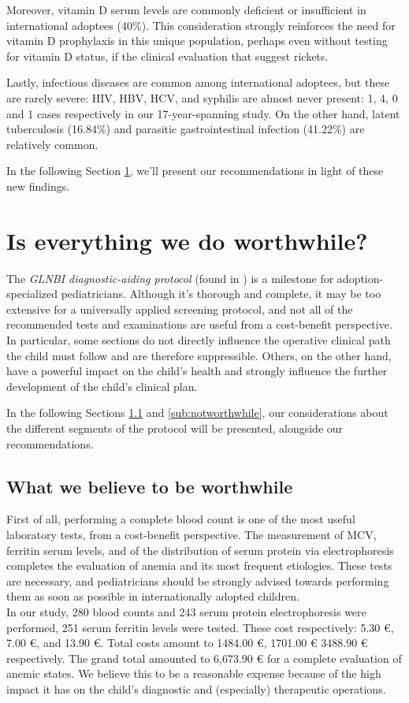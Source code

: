 Moreover, vitamin D serum levels are commonly deficient or insufficient in international adoptees (40\%). This consideration strongly reinforces the need for vitamin D prophylaxis  in this unique population, perhaps even without testing for vitamin D status, if the clinical evaluation that suggest rickets.

Lastly, infectious diseases are common among international adoptees, but these are rarely severe: HIV, HBV, HCV, and syphilis are almost never present: 1, 4, 0 and 1 cases respectively in our 17-year-spanning study. On the other hand, latent tuberculosis (16.84\%) and parasitic gastrointestinal infection (41.22\%) are relatively common.

In the following Section \ref{sec:worthwhile?}, we'll present our recommendations in light of these new findings.

\section{Is everything we do worthwhile?}\label{sec:worthwhile?}
The \textit{GLNBI diagnostic-aiding protocol} (found in \cite{GNLBI2}) is a milestone for adoption-specialized pediatricians. Although it's thorough and complete, it may be too extensive for a universally applied screening protocol, and not all of the recommended tests and examinations are useful from a cost-benefit perspective. In particular, some sections do not directly influence the operative clinical path the child must follow and are therefore suppressible. Others, on the other hand, have a powerful impact on the child's health and strongly influence the further development of the child's clinical plan.

In the following Sections \ref{sub:worthwhile} and \ref{sub:notworthwhile}, our considerations about the different segments of the protocol will be presented, alongside our recommendations.

\subsection{What we believe to be worthwhile}\label{sub:worthwhile}
First of all, performing a complete blood count is one of the most useful laboratory tests, from a cost-benefit perspective. The measurement of MCV, ferritin serum levels, and of the distribution of serum protein via electrophoresis completes the evaluation of anemia and its most frequent etiologies. These tests are necessary, and pediatricians should be strongly advised towards performing them as soon as possible in internationally adopted children.\\
In our study, 280 blood counts and 243 serum protein electrophoresis were performed, 251 serum ferritin levels were tested. These cost respectively: 5.30 €, 7.00 €, and 13.90 €. Total costs amount to 1484.00 €, 1701.00 € 3488.90 € respectively. The grand total amounted to 6,673.90 € for a complete evaluation of anemic states. We believe this to be a reasonable expense because of the high impact it has on the child's diagnostic and (especially) therapeutic operations.

